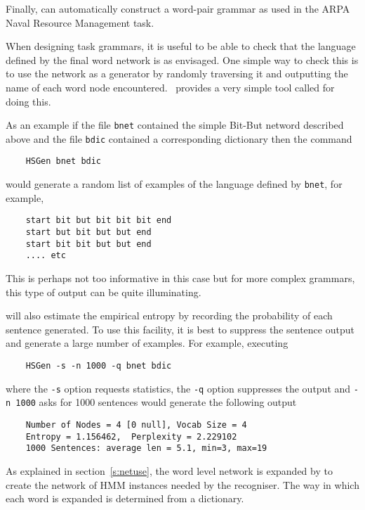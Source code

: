 Finally,  can automatically construct a 
word-pair grammar as 
used in the ARPA Naval Resource Management task.



When designing task grammars, it is useful to be able to check
that the  language defined by the final word network is as envisaged.
One simple way to check this is to use the network as a generator by
randomly traversing it and outputting the name of each word node
encountered.  \HTK\ provides a very simple tool called 
for doing this.

As an example if the file \texttt{bnet} contained the simple Bit-But
netword described above and the file \texttt{bdic} contained a corresponding
dictionary then the command
\begin{verbatim}
    HSGen bnet bdic
\end{verbatim}
would generate a random list of examples of the language
defined by  \texttt{bnet}, for example,
\begin{verbatim}
    start bit but bit bit bit end 
    start but bit but but end 
    start bit bit but but end 
    .... etc
\end{verbatim}
This is perhaps not too informative in this case but for more
complex grammars, this type of output can be quite illuminating.

 will also estimate the empirical entropy
by recording
the probability of each sentence generated.  
To use this facility, it
is best to suppress the sentence output and generate a large number
of examples.  For example, executing
\begin{verbatim}
    HSGen -s -n 1000 -q bnet bdic
\end{verbatim}
where the \texttt{-s} option requests statistics, the \texttt{-q} option
suppresses the output and \texttt{-n 1000} asks for 1000 sentences
would generate the following output
\begin{verbatim}
    Number of Nodes = 4 [0 null], Vocab Size = 4
    Entropy = 1.156462,  Perplexity = 2.229102
    1000 Sentences: average len = 5.1, min=3, max=19
\end{verbatim}


As explained in section~\ref{s:netuse}, the word level network is expanded by
 to create the network of HMM instances needed by the recogniser.
The way in which each word is expanded is determined from a
dictionary.

